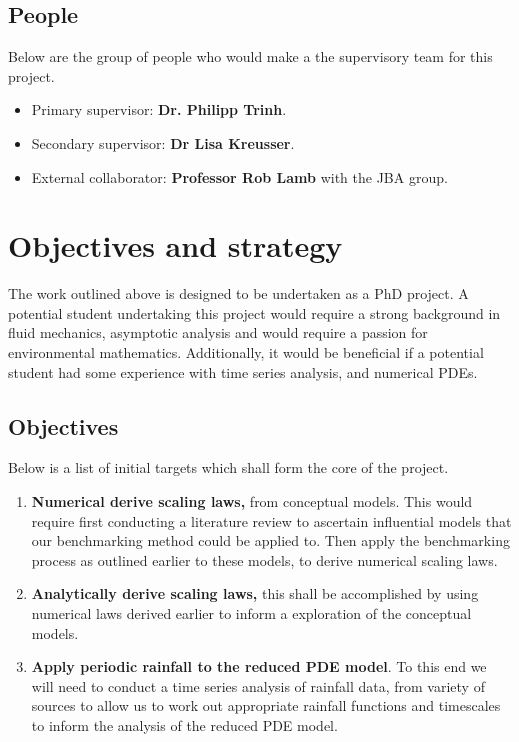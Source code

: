 \documentclass[11pt]{article}
\begin{document}
\vspace{5pt}
\subsection{People}
Below are the group of people who would make a the supervisory team for this project.
\begin{itemize}
    \item Primary supervisor: \textbf{Dr. Philipp Trinh}.
    \item Secondary supervisor: \textbf{Dr Lisa Kreusser}.
    \item External collaborator: \textbf{Professor Rob Lamb} with the JBA group.
\end{itemize}



\section{Objectives and strategy}

The work outlined above is designed to be undertaken as a PhD project. A potential student undertaking this project would require a strong background in fluid mechanics, asymptotic analysis and would require a passion for environmental mathematics. 
Additionally, it would be beneficial if a potential student had some experience with time series analysis, and numerical PDEs.

\subsection{Objectives}
Below is a list of initial targets which shall form the core of the project.

\begin{enumerate}
    \item \textbf{Numerical derive scaling laws,} from conceptual models. This would require first conducting a literature review to ascertain influential models that our benchmarking method could be applied to. Then apply the benchmarking process as outlined earlier to these models, to derive numerical scaling laws.
    \item \textbf{Analytically derive scaling laws,} this shall be accomplished by using numerical laws derived earlier to inform a exploration of the conceptual models.
    \item \textbf{Apply periodic rainfall to the reduced PDE model}. To this end we will need to conduct a time series analysis of rainfall data, from variety of sources to allow us to work out appropriate rainfall functions and timescales to inform the analysis of the reduced PDE model.
\end{enumerate}
\end{document}
